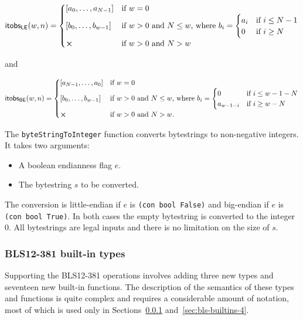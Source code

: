 $$
\itobsLE (w,n) =
\begin{cases}
  [a_0, \ldots, a_{N-1}] & \text{if $w=0$} \\
  [b_0, \ldots, b_{w-1}] &  \text{if $w > 0$ and $N\leq w$, where }
      b_i = \begin{cases}
                a_i & \text{if $i \leq N-1$} \\
                0   & \text{if $i \geq N$}\\
            \end{cases}\\
  \errorX & \text{if $w > 0$ and $N > w$}
\end{cases}
$$

\noindent and

$$
\noindent
\itobsBE (w,n) =
\begin{cases}
  [a_{N-1}, \ldots, a_0] & \text{if $w=0$} \\
  [b_0, \ldots, b_{w-1}] &  \text{if $w > 0$ and $N\leq w$, where }
      b_i = \begin{cases}
                0   & \text{if $i \leq w-1-N$}\\
                a_{w-1-i} & \text{if $i \geq w-N$} \\
            \end{cases}\\
  \errorX & \text{if $w > 0$ and $N > w$.}
\end{cases}
$$

\label{note:bstoi}
The \texttt{byteStringToInteger} function converts bytestrings to non-negative
integers.  It takes two arguments:
\begin{itemize}
\item A boolean endianness flag $e$.
\item The bytestring $s$ to be converted.
\end{itemize}
\noindent  
The conversion is little-endian if $e$ is \texttt{(con bool False)} and
big-endian if $e$ is \texttt{(con bool True)}. In both cases the empty bytestring is
converted to the integer 0. All bytestrings are legal inputs and there is no
limitation on the size of $s$.

\subsubsection{BLS12-381 built-in types}
\label{sec:bls-types-4}

\noindent Supporting the BLS12-381 operations involves adding three new types
and seventeen new built-in functions.  The description of the semantics of these
types and functions is quite complex and requires a considerable amount of
notation, most of which is used only in Sections~\ref{sec:bls-types-4} and~\ref{sec:bls-builtins-4}.

